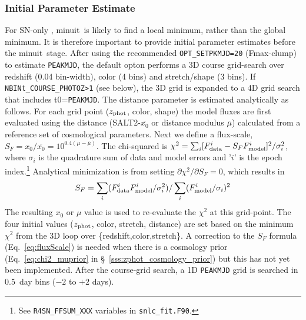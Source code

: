 \documentclass[12pt]{article}
\newcommand{\Zphot}{z_{\rm phot}}
\newcommand{\minuit}{{\sc minuit}}
\begin{document}
   \clearpage
   \subsubsection{Initial Parameter Estimate}
   \label{sss:photoz_ini}

\newcommand{\dSCALE}{d_{\rm scale}}
\newcommand{\Fdata}{F_{\rm data}^i}
\newcommand{\Fmodel}{F_{\rm model}^i}
\newcommand{\fluxScale}{S_{F}}


For SN-only \lcfitz, \minuit\ is likely to find a
local minimum, rather than the global minimum. It is therefore
important to provide initial parameter estimates before the
\minuit\ stage. 
After using the recommended \verb|OPT_SETPKMJD=20| (Fmax-clump)
to estimate {\tt PEAKMJD},
the default opton performs a 3D course grid-search over 
redshift (0.04 bin-width), color (4 bins) and stretch/shape (3 bins).
If \verb|NBINt_COURSE_PHOTOZ>1| (see below), 
the 3D grid is expanded to a 4D grid search that includes t0={\tt PEAKMJD}.
The distance parameter is estimated analytically as follows.
For each grid point ($\Zphot$, color, shape) the model fluxes
are first evaluated using the distance
(SALT2-$\bar{x_0}$ or distance modulus $\bar\mu$) 
calculated from a reference set of cosmological parameters. 
Next we define a flux-scale,
  $\fluxScale = x_0/\bar{x_0} = 10^{0.4(\mu-\bar{\mu})}$.
%
The chi-squared is
 $\chi^2 = \sum_i [\Fdata - \fluxScale\Fmodel]^2/\sigma_i^2$,
where $\sigma_i$ is the quadrature sum of data and model errors
and '$i$' is the epoch index.\footnote{See {\tt R4SN\_FFSUM\_XXX}
   variables in {\tt snlc\_fit.F90}.}
Analytical minimization is from setting $\partial \chi^2/\partial\fluxScale = 0$, 
which results in
%
\begin{equation}
  \fluxScale
    = \sum_i( \Fdata\Fmodel/\sigma_i^2) / \sum_i(\Fmodel/\sigma_i)^2
    \label{eq:fluxScale}
\end{equation}
%
The resulting $x_0$ or $\mu$ value is used to re-evaluate
the $\chi^2$ at this grid-point. 
The four initial values ($\Zphot$, color, stretch, distance)
are set based on the minimum $\chi^2$ from the 3D loop over \{redshift,color,stretch\}. 
A correction to the $\fluxScale$ formula (Eq.~\ref{eq:fluxScale})
is needed when there is a cosmology prior
(Eq.~\ref{eq:chi2_muprior} in \S~\ref{sss:zphot_cosmology_prior})
but this has not yet been implemented.
After the course-grid search, a 1D {\tt PEAKMJD} grid is searched in 0.5~day bins ($-2$ to $+2$ days).
\end{document}
